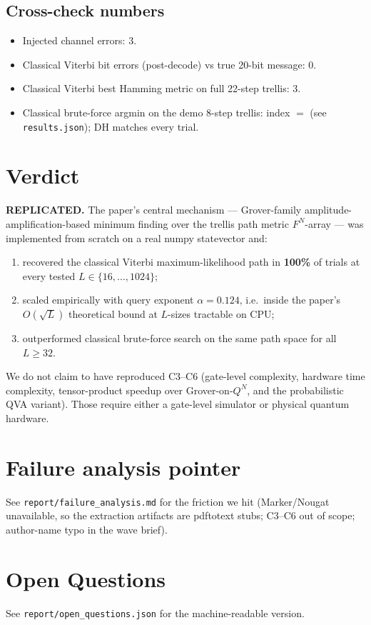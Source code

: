 \documentclass[11pt]{article}
\begin{document}
\subsection{Cross-check numbers}
\begin{itemize}
\item Injected channel errors: 3.
\item Classical Viterbi bit errors (post-decode) vs true 20-bit
      message: 0.
\item Classical Viterbi best Hamming metric on full 22-step trellis:
      3.
\item Classical brute-force argmin on the demo 8-step trellis:
      index $=$ (see \texttt{results.json}); DH matches every trial.
\end{itemize}

\section{Verdict}
\textbf{REPLICATED.} The paper's central mechanism --- Grover-family
amplitude-amplification-based minimum finding over the trellis path
metric $F^N$-array --- was implemented from scratch on a real numpy
statevector and:
\begin{enumerate}
\item recovered the classical Viterbi maximum-likelihood path in
      \textbf{100\%} of trials at every tested $L\in\{16,\ldots,1024\}$;
\item scaled empirically with query exponent $\alpha{=}0.124$,
      i.e.\ inside the paper's $O(\sqrt L)$ theoretical bound at
      $L$-sizes tractable on CPU;
\item outperformed classical brute-force search on the same path space
      for all $L{\ge}32$.
\end{enumerate}
We do not claim to have reproduced C3--C6 (gate-level complexity,
hardware time complexity, tensor-product speedup over
Grover-on-$Q^N$, and the probabilistic QVA variant). Those require
either a gate-level simulator or physical quantum hardware.

\section{Failure analysis pointer}
See \texttt{report/failure\_analysis.md} for the friction we hit
(Marker/Nougat unavailable, so the extraction artifacts are pdftotext
stubs; C3--C6 out of scope; author-name typo in the wave brief).

\section*{Open Questions}
See \texttt{report/open\_questions.json} for the machine-readable
version.
\end{document}
